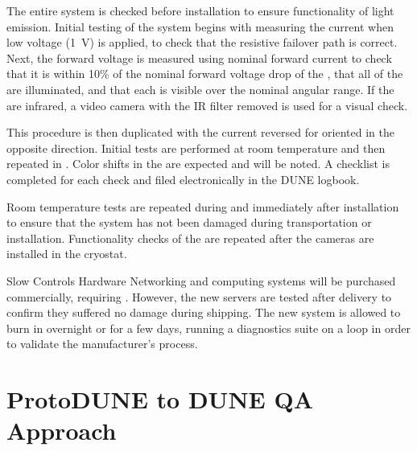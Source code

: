 The entire  system is checked before installation to ensure
functionality of light emission. Initial testing of the system begins
with measuring the current when low voltage (1~V) is applied, to check
that the resistive  failover path is correct. Next, the
forward voltage is measured using nominal forward current to check
that it is within 10\% of the nominal forward voltage drop of the
, that all of the  are illuminated, and that
each  is visible over the nominal angular range. If the
 are infrared, a video camera with the IR filter removed
is used for a visual check.


This procedure is then duplicated with the current reversed for
 oriented in the opposite direction. Initial tests are
performed at room temperature and then repeated in . Color
shifts in the  are expected and will be noted. A checklist
is completed for each  check and filed electronically in the
DUNE logbook.

Room temperature tests are repeated during and immediately after
installation to ensure that the system has not been damaged during
transportation or installation. Functionality checks of the
 are repeated after the cameras are installed in the
cryostat.

Slow Controls Hardware Networking and computing systems will be
purchased commercially, requiring . However, the new servers
are tested after delivery to confirm they suffered no damage during
shipping. The new system is allowed to burn in overnight or for a few
days, running a diagnostics suite on a loop in order to validate the
manufacturer's  process.


\section{ProtoDUNE to DUNE QA Approach}

